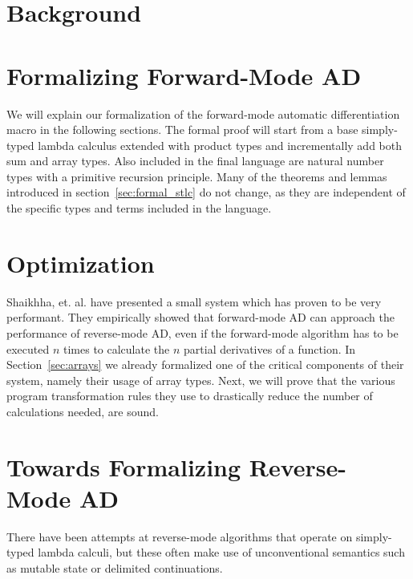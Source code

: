 \documentclass[11pt, final]{article}
\begin{document}

\newpage


\newpage

\setcounter{page}{3}
\tableofcontents
\newpage



\section{Background}






% 

\section{Formalizing Forward-Mode AD}\label{sec:forward}
  We will explain our formalization of the forward-mode automatic differentiation macro in the following sections.
  The formal proof will start from a base simply-typed lambda calculus extended with product types and incrementally add both sum and array types.
  Also included in the final language are natural number types with a primitive recursion principle.
  Many of the theorems and lemmas introduced in section~\ref{sec:formal_stlc} do not change, as they are independent of the specific types and terms included in the language.
  
  
  
\section{Optimization}
  Shaikhha, et. al. have presented a small system which has proven to be very performant\cite{Shaikha2019}.
  They empirically showed that forward-mode AD can approach the performance of reverse-mode AD, even if the forward-mode algorithm has to be executed $n$ times to calculate the $n$ partial derivatives of a function.
  In Section~\ref{sec:arrays} we already formalized one of the critical components of their system, namely their usage of array types.
  Next, we will prove that the various program transformation rules they use to drastically reduce the number of calculations needed, are sound.
  
\section{Towards Formalizing Reverse-Mode AD}
  There have been attempts at reverse-mode algorithms that operate on simply-typed lambda calculi\cite{ShiftReset:Backpropagator}\cite{Brunel2020BackpropagationIT}\cite{PearlmutterSiskind2008}, but these often make use of unconventional semantics such as mutable state or delimited continuations.
\end{document}
